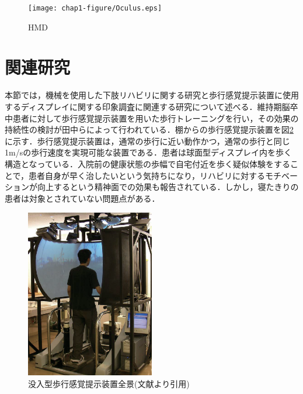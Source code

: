 \begin{figure}[tbp]
	\centering
			\texttt{[image: chap1-figure/Oculus.eps]}
	\caption{HMD}
	\label{fig:Oculus}
\end{figure}

\section{関連研究}
本節では，機械を使用した下肢リハビリに関する研究と歩行感覚提示装置に使用するディスプレイに関する印象調査に関連する研究について述べる．維持期脳卒中患者に対して歩行感覚提示装置を用いた歩行トレーニングを行い，その効果の持続性の検討\cite{筑波歩行感覚提示}が田中らによって行われている．棚からの歩行感覚提示装置を図\ref{fig:tukuba}に示す．歩行感覚提示装置は，通常の歩行に近い動作かつ，通常の歩行と同じ1m/sの歩行速度を実現可能な装置である．患者は球面型ディスプレイ内を歩く構造となっている．入院前の健康状態の歩幅で自宅付近を歩く疑似体験をすることで，患者自身が早く治したいという気持ちになり，リハビリに対するモチベーションが向上するという精神面での効果も報告されている．しかし，寝たきりの患者は対象とされていない問題点がある．

\begin{figure}[tbp]
	\centering
			\includegraphics[width=0.5\textwidth]{chap1-figure/tukuba.eps}
	\caption{没入型歩行感覚提示装置全景(文献\cite{筑波歩行感覚提示画像}より引用)}
	\label{fig:tukuba}
\end{figure}

